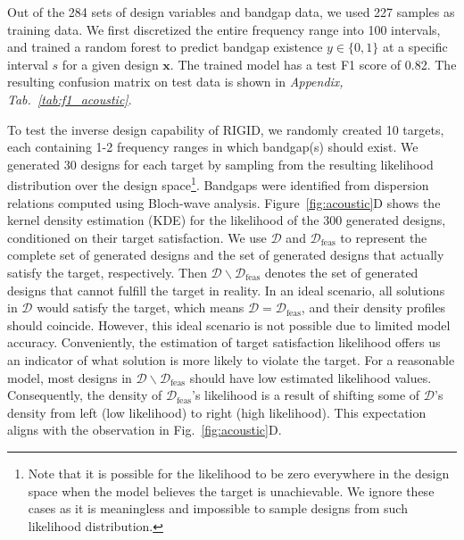 \documentclass{article}
\begin{document}
Out of the 284 sets of design variables and bandgap data, we used 227 samples as training data. We first discretized the entire frequency range into 100 intervals, and trained a random forest to predict bandgap existence $y\in\{0,1\}$ at a specific interval $s$ for a given design $\mathbf{x}$. The trained model has a test F1 score of 0.82. The resulting confusion matrix on test data is shown in \textit{Appendix, Tab.~\ref{tab:f1_acoustic}}.

To test the inverse design capability of RIGID, we randomly created 10 targets, each containing 1-2 frequency ranges in which bandgap(s) should exist. 
We generated 30 designs for each target by sampling from the resulting likelihood distribution over the design space\footnote{Note that it is possible for the likelihood to be zero everywhere in the design space when the model believes the target is unachievable. We ignore these cases as it is meaningless and impossible to sample designs from such likelihood distribution.}. Bandgaps were identified from dispersion relations computed using Bloch-wave analysis.
Figure~\ref{fig:acoustic}D shows the kernel density estimation (KDE) for the likelihood of the 300 generated designs, conditioned on their target satisfaction.
We use $\mathcal{D}$ and $\mathcal{D}_\text{feas}$ to represent the complete set of generated designs and the set of generated designs that actually satisfy the target, respectively. Then $\mathcal{D}\backslash\mathcal{D}_\text{feas}$ denotes the set of generated designs that cannot fulfill the target in reality.
In an ideal scenario, all solutions in $\mathcal{D}$ would satisfy the target, which means $\mathcal{D} = \mathcal{D}_\text{feas}$, and their density profiles should coincide. However, this ideal scenario is not possible due to limited model accuracy. Conveniently, the estimation of target satisfaction likelihood offers us an indicator of what solution is more likely to violate the target. For a reasonable model, most designs in $\mathcal{D}\backslash\mathcal{D}_\text{feas}$ should have low estimated likelihood values. Consequently, the density of $\mathcal{D}_\text{feas}$'s likelihood is a result of shifting some of $\mathcal{D}$'s density from left (low likelihood) to right (high likelihood). This expectation aligns with the observation in Fig.~\ref{fig:acoustic}D.
\end{document}
